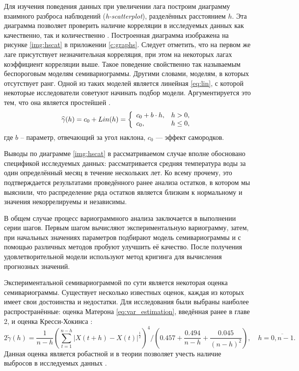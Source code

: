 Для изучения поведения данных при увеличении лага построим диаграмму взаимного разброса наблюдений (\textit{h-scatterplot}), разделённых расстоянием $ h $. Эта диаграмма позволяет проверить наличие корреляции в исследуемых данных как качественно, так и количественно \cite{saveliev2012}. Построенная диаграмма изображена на рисунке \ref{img:hscat} в приложении \ref{c:graphs}. Следует отметить, что на первом же лаге присутствует незначительная корреляция, при этом на некоторых лагах коэффициент корреляции выше. Такое поведение свойственно так называемым беспороговым моделям семивариограммы. Другими словами, моделям, в которых отсутствует ранг. Одной из таких моделей является линейная \eqref{eq:lin}, с которой некоторые исследователи советуют начинать подбор модели. Аргументируется это тем, что она является простейшей \cite{saveliev2012}.
\begin{equation}
\label{eq:lin}
	\widehat{\gamma}(h) = c_0 + Lin(h) = \left\{
 \begin{array}{l l}
   c_0 + b \cdot h, & h > 0, \\
   c_0, & h \leq 0,
 \end{array} \right.
\end{equation}
где $ b $ -- параметр, отвечающий за угол наклона, $ c_0 $ --- эффект самородков.

Выводы по диаграмме \ref{img:hscat} в рассматриваемом случае вполне обосновано спецификой исследуемых данных: рассматривается средняя температура воды за один определённый месяц в течение нескольких лет. Ко всему прочему, это подтверждается результатами проведённого ранее анализа остатков, в котором мы выяснили, что распределение ряда остатков является близким к нормальному и значения некоррелируемы и независимы.

В общем случае процесс вариограммного анализа заключается в выполнении серии шагов. Первым шагом вычисляют экспериментальную вариограмму, затем, при начальных значениях параметров подбирают модель семивариограммы и с помощью различных методов пробуют улучшить её качество. После получения удовлетворительной модели используют метод кригинга для вычисления прогнозных значений.

Экспериментальной семивариограммой по сути является некоторая оценка семивариограммы. Существует несколько известных оценок, каждая из которых имеет свои достоинства и недостатки. Для исследования были выбраны наиболее распространённые: оценка Матерона \eqref{eq:var_estimation}, введённая ранее в главе 2, и оценка Кресси-Хокинса \cite{cressie1993statistics, dutter}:
\begin{equation}
\label{eq:cressie}
	2 \tilde{\gamma}(h) = \frac{1}{n - h} (\sum_{t = 1}^{n - h} | X(t + h) - X(t) |^{\frac{1}{2}} )^4 / (0.457 + \frac{0.494}{n - h} + \frac{0.045}{(n - h)^2}), \quad h = \overline{0, n - 1}.
\end{equation}
Данная оценка является робастной и в теории позволяет учесть наличие выбросов в исследуемых данных \cite{MINGOTI2008}.

